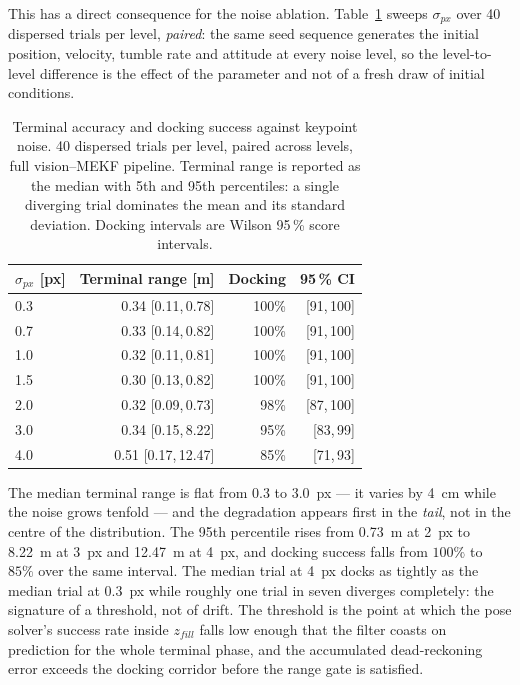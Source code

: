 This has a direct consequence for the noise ablation.
Table~\ref{tab:ablation} sweeps $\sigma_{px}$ over 40 dispersed trials per
level, \emph{paired}: the same seed sequence generates the initial position,
velocity, tumble rate and attitude at every noise level, so the level-to-level
difference is the effect of the parameter and not of a fresh draw of initial
conditions.

\begin{table}[!tb]
\caption{Terminal accuracy and docking success against keypoint noise. 40
dispersed trials per level, paired across levels, full vision--MEKF pipeline.
Terminal range is reported as the median with 5th and 95th percentiles: a
single diverging trial dominates the mean and its standard deviation.
Docking intervals are Wilson 95\,\% score intervals.}
\label{tab:ablation}
\centering
\begin{tabular}{lrrr}
\hline
$\sigma_{px}$ [px] & Terminal range [m] & Docking & 95\,\% CI \\
\hline
0.3 & 0.34 [0.11,\,0.78]  & 100\% & [91,\,100] \\
0.7 & 0.33 [0.14,\,0.82]  & 100\% & [91,\,100] \\
1.0 & 0.32 [0.11,\,0.81]  & 100\% & [91,\,100] \\
1.5 & 0.30 [0.13,\,0.82]  & 100\% & [91,\,100] \\
2.0 & 0.32 [0.09,\,0.73]  &  98\% & [87,\,100] \\
3.0 & 0.34 [0.15,\,8.22]  &  95\% & [83,\,99]  \\
4.0 & 0.51 [0.17,\,12.47] &  85\% & [71,\,93]  \\
\hline
\end{tabular}
\end{table}

The median terminal range is flat from 0.3 to 3.0~px --- it varies by 4~cm
while the noise grows tenfold --- and the degradation appears first in the
\emph{tail}, not in the centre of the distribution. The 95th percentile rises
from 0.73~m at 2~px to 8.22~m at 3~px and 12.47~m at 4~px, and docking success
falls from $100\%$ to $85\%$ over the same interval. The median trial at 4~px
docks as tightly as the median trial at 0.3~px while roughly one trial in
seven diverges completely: the signature of a threshold, not of drift. The
threshold is the point at which the pose solver's success rate inside $z_{fill}$ falls low
enough that the filter coasts on prediction for the whole terminal phase, and
the accumulated dead-reckoning error exceeds the docking corridor before the
range gate is satisfied.

